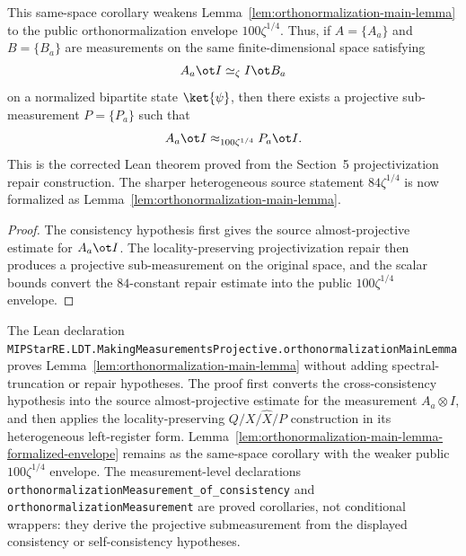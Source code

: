 \begin{lemma}\label{lem:orthonormalization-main-lemma-formalized-envelope}
	\leanok
	This same-space corollary weakens Lemma~\ref{lem:orthonormalization-main-lemma}
	to the public orthonormalization envelope \(100\zeta^{1/4}\).  Thus, if \(A=\{A_a\}\) and
	\(B=\{B_a\}\) are measurements on the same finite-dimensional space satisfying
	\[
		A_a \ot I \simeq_\zeta I \ot B_a
	\]
	on a normalized bipartite state \(\ket{\psi}\), then there exists a projective
	sub-measurement \(P=\{P_a\}\) such that
	\[
		A_a \ot I \approx_{100\zeta^{1/4}} P_a \ot I .
	\]
	This is the corrected Lean theorem proved from the Section~5
	projectivization repair construction.  The sharper heterogeneous source
	statement \(84\zeta^{1/4}\) is now formalized as
	Lemma~\ref{lem:orthonormalization-main-lemma}.
\end{lemma}
\begin{proof}
	\leanok
	The consistency hypothesis first gives the source almost-projective estimate
	for \(A_a\ot I\).  The locality-preserving projectivization repair then
	produces a projective sub-measurement on the original space, and the scalar
	bounds convert the \(84\)-constant repair estimate into the public
	\(100\zeta^{1/4}\) envelope.
\end{proof}

\begin{remark}
	\label{rem:lean-orthonormalization-main-declarations}
	The Lean declaration
	\texttt{MIPStarRE.LDT.MakingMeasurementsProjective.orthonormalizationMainLemma}
	proves Lemma~\ref{lem:orthonormalization-main-lemma} without adding
	spectral-truncation or repair hypotheses.  The proof first converts the
	cross-consistency hypothesis into the source almost-projective estimate for
	the measurement \(A_a \otimes I\), and then applies the locality-preserving
	\(Q/X/\widehat X/P\) construction in its heterogeneous left-register form.
	Lemma~\ref{lem:orthonormalization-main-lemma-formalized-envelope} remains as
	the same-space corollary with the weaker public \(100\zeta^{1/4}\) envelope.
	The measurement-level declarations
	\texttt{orthonormalizationMeasurement\_of\_consistency} and
	\texttt{orthonormalizationMeasurement} are proved corollaries, not
	conditional wrappers: they derive the projective submeasurement from the
	displayed consistency or self-consistency hypotheses.
\end{remark}

